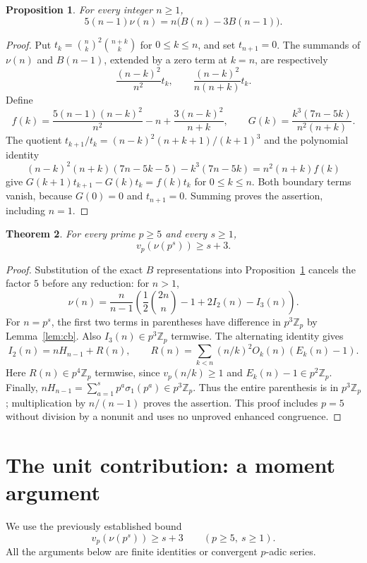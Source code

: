 \documentclass[11pt]{amsart}
\newtheorem{theorem}{Theorem}[section]
\newtheorem{proposition}[theorem]{Proposition}
\theoremstyle{definition}
\theoremstyle{remark}
\begin{document}
\begin{proposition}\label{prop:nu-exact}
For every integer $n\geq 1$,
\[
 5(n-1)\nu(n)=n\bigl(B(n)-3B(n-1)\bigr).
\]
\end{proposition}
\begin{proof}
Put $t_k=\binom nk^2\binom{n+k}k$ for $0\leq k\leq n$, and set
$t_{n+1}=0$. The summands of $\nu(n)$ and $B(n-1)$, extended by a
zero term at $k=n$, are respectively
\[
 \frac{(n-k)^2}{n^2}t_k,
 \qquad \frac{(n-k)^2}{n(n+k)}t_k.
\]
Define
\[
 f(k)=\frac{5(n-1)(n-k)^2}{n^2}-n+
             \frac{3(n-k)^2}{n+k},
 \qquad G(k)=\frac{k^3(7n-5k)}{n^2(n+k)}.
\]
The quotient $t_{k+1}/t_k=(n-k)^2(n+k+1)/(k+1)^3$ and the polynomial
identity
\[
 (n-k)^2(n+k)(7n-5k-5)-k^3(7n-5k)
   =n^2(n+k)f(k)
\]
give $G(k+1)t_{k+1}-G(k)t_k=f(k)t_k$ for $0\leq k\leq n$.
Both boundary terms vanish, because $G(0)=0$ and $t_{n+1}=0$.
Summing proves the assertion, including $n=1$.
\end{proof}


\begin{theorem}\label{thm:nu-all-powers}
For every prime $p\ge5$ and every $s\ge1$,
\[
v_p(\nu(p^s))\ge s+3.
\]
\end{theorem}
\begin{proof}
Substitution of the exact $B$ representations into
Proposition~\ref{prop:nu-exact} cancels the factor $5$ before any reduction:
for $n>1$,
\[
\nu(n)=\frac{n}{n-1}
\left(\frac12\binom{2n}{n}-1+2I_2(n)-I_3(n)\right).
\]
For $n=p^s$, the first two terms in parentheses have difference in
$p^3\mathbb Z_p$ by Lemma~\ref{lem:cb}.
Also $I_3(n)\in p^3\mathbb Z_p$ termwise. The alternating identity gives
\[
I_2(n)=nH_{n-1}+R(n),\qquad
R(n)=\sum_{k<n}(n/k)^2O_k(n)(E_k(n)-1).
\]
Here $R(n)\in p^4\mathbb Z_p$ termwise, since
$v_p(n/k)\ge1$ and $E_k(n)-1\in p^2\mathbb Z_p$.
Finally,
$nH_{n-1}=\sum_{a=1}^s p^a\sigma_1(p^a)\in p^3\mathbb Z_p$.
Thus the entire parenthesis is in $p^3\mathbb Z_p$; multiplication by
$n/(n-1)$ proves the assertion. This proof includes $p=5$ without division
by a nonunit and uses no unproved enhanced congruence.
\end{proof}

\section{The unit contribution: a moment argument}

We use the previously established bound
\begin{equation}\label{eq:nu-input-unit}
 v_p(\nu(p^s))\ge s+3\qquad(p\ge5,\ s\ge1).
\end{equation}
All the arguments below are finite identities or convergent $p$-adic series.
\end{document}
